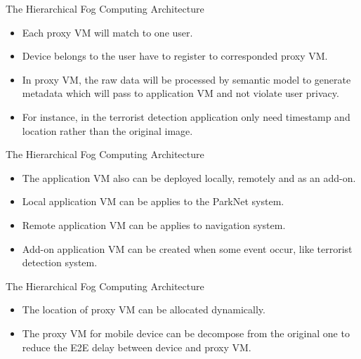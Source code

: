 \documentclass{beamer}
\begin{document}
\begin{frame} {The Hierarchical Fog Computing Architecture} 
    \begin{itemize}
         \item {Each proxy VM will match to one user.}
         \item {Device belongs to the user have to register to corresponded proxy VM.}
         \item {In proxy VM, the raw data will be processed by semantic model to generate metadata which will pass to application VM and not violate user privacy.}
         \item {For instance, in the terrorist detection application only need timestamp and location rather than the original image.}
    \end{itemize}
\end{frame}

\begin{frame} {The Hierarchical Fog Computing Architecture} 
    \begin{itemize}
         \item {The application VM also can be deployed locally, remotely and as an add-on.}
         \item {Local application VM can be applies to the ParkNet system.}
         \item {Remote application VM can be applies to navigation system.}
         \item {Add-on application VM can be created when some event occur, like terrorist detection system.}
    \end{itemize}
\end{frame}

\begin{frame} {The Hierarchical Fog Computing Architecture} 
    \begin{itemize}
         \item {The location of proxy VM can be allocated dynamically.}
         \item {The proxy VM for mobile device can be decompose from the original one to reduce the E2E delay between device and proxy VM.}
    \end{itemize}
\end{frame}
\end{document}
